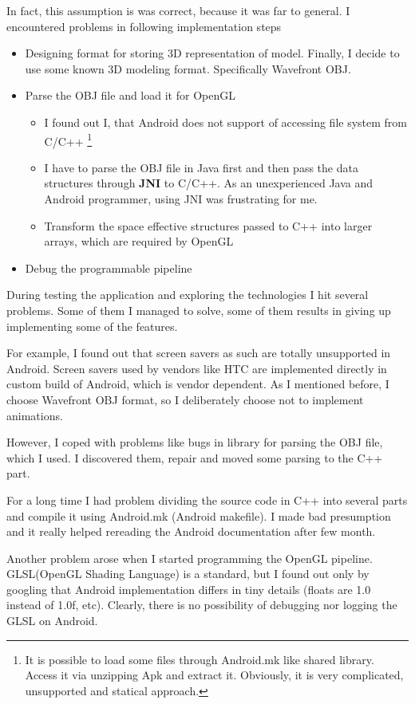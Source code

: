 In fact, this assumption is was correct, because it was far to general.
I encountered problems in following implementation steps
\begin{itemize}
    \item Designing format for storing 3D representation of model. Finally, I decide to use some known 3D modeling format. Specifically Wavefront OBJ.
    \item Parse the OBJ file and load it for OpenGL
        \begin{itemize}
            \item I found out I, that Android does not support of accessing file system from C/C++ \footnote{It is possible to load some files through Android.mk like shared library. Access it via unzipping Apk and extract it. Obviously, it is very complicated, unsupported and statical approach.}
            \item I have to parse the OBJ file in Java first and then pass the data structures through {\bf JNI} to C/C++.
            As an unexperienced Java and Android programmer, using JNI was frustrating for me. 
            \item Transform the space effective structures passed to C++ into larger arrays, which are required by OpenGL
        \end{itemize}
    \item Debug the programmable pipeline
\end{itemize}

During testing the application and exploring the technologies I hit several problems.
Some of them I managed to solve, some of them results in giving up implementing some of the features.

For example, I found out that screen savers as such are totally unsupported in Android. Screen savers
used by vendors like HTC are implemented directly in custom build of Android, which is vendor dependent.
As I mentioned before, I choose Wavefront OBJ format, so I deliberately choose not to implement animations.

However, I coped with problems like bugs in library for parsing the OBJ file, which I used. 
I discovered them, repair and moved some parsing to the C++ part.
    
For a long time I had problem dividing the source code in C++ into several parts
and compile it using Android.mk (Android makefile). I made bad presumption and 
it really helped rereading the Android documentation after few month.

Another problem arose when I started programming the OpenGL pipeline.
GLSL(OpenGL Shading Language) is a standard, 
but I found out  only by googling
that Android implementation differs in tiny details (floats are 1.0 instead of 1.0f, etc).
Clearly, there is no possibility of debugging nor logging the GLSL on Android.

